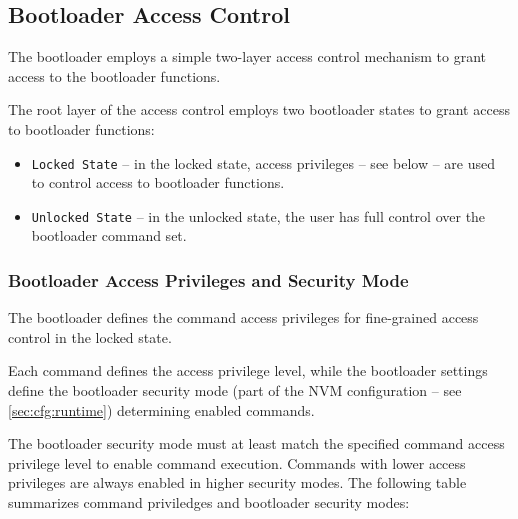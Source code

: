 \subsection{Bootloader Access Control} \label{sec:security:access}

The bootloader employs a simple two-layer access control mechanism to grant access to the bootloader functions.

The root layer of the access control employs two bootloader states to grant access to bootloader functions:

\begin{itemize}
  \item \texttt{Locked State} -- in the locked state, access privileges -- see  below -- are used to control access to bootloader functions.
  \item \texttt{Unlocked State} -- in the unlocked state, the user has full control over the bootloader command set.
\end{itemize}

\subsubsection*{Bootloader Access Privileges and Security Mode} \label{sec:security:secModes}

The bootloader defines the command access privileges for fine-grained access control in the locked state. 

Each command defines the access privilege level, while the bootloader settings define the bootloader security mode
(part of the NVM configuration -- see \ref{sec:cfg:runtime}) determining enabled commands. 

The bootloader security mode must at least match the specified command access privilege level to enable command execution.
Commands with lower access privileges are always enabled in higher security modes.
The following table summarizes command priviledges and bootloader security modes:

